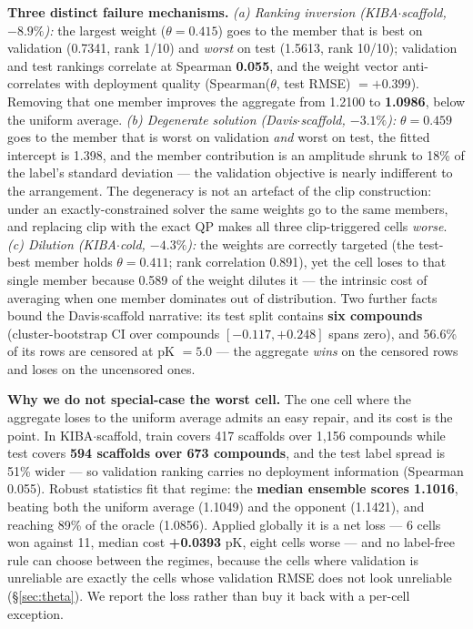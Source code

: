 \documentclass[10pt,letterpaper]{article}
\begin{document}
\textbf{Three distinct failure mechanisms.}\label{sec:fail}
\emph{(a) Ranking inversion (KIBA$\cdot$scaffold, $-8.9\%$):} the largest weight
($\theta = 0.415$) goes to the member that is best on validation (0.7341, rank 1/10)
and \emph{worst} on test (1.5613, rank 10/10); validation and test rankings correlate
at Spearman \textbf{0.055}, and the weight vector anti-correlates with deployment
quality (Spearman($\theta$, test RMSE) $= +0.399$). Removing that one member improves
the aggregate from 1.2100 to \textbf{1.0986}, below the uniform average.
\emph{(b) Degenerate solution (Davis$\cdot$scaffold, $-3.1\%$):} $\theta = 0.459$
goes to the member that is worst on validation \emph{and} worst on test, the fitted
intercept is 1.398, and the member contribution is an amplitude shrunk to 18\% of the
label's standard deviation --- the validation objective is nearly indifferent to the
arrangement. The degeneracy is not an artefact of the clip construction: under an
exactly-constrained solver the same weights go to the same members, and replacing
clip with the exact QP makes all three clip-triggered cells \emph{worse}.
\emph{(c) Dilution (KIBA$\cdot$cold, $-4.3\%$):} the weights are correctly targeted
(the test-best member holds $\theta = 0.411$; rank correlation 0.891), yet the cell
loses to that single member because 0.589 of the weight dilutes it --- the intrinsic
cost of averaging when one member dominates out of distribution. Two further facts
bound the Davis$\cdot$scaffold narrative: its test split contains \textbf{six
compounds} (cluster-bootstrap CI over compounds $[-0.117,+0.248]$ spans zero), and
56.6\% of its rows are censored at pK $= 5.0$ --- the aggregate \emph{wins} on the
censored rows and loses on the uncensored ones.

\textbf{Why we do not special-case the worst cell.} The one cell where the aggregate
loses to the uniform average admits an easy repair, and its cost is the point. In
KIBA$\cdot$scaffold, train covers 417 scaffolds over 1{,}156 compounds while test
covers \textbf{594 scaffolds over 673 compounds}, and the test label spread is 51\%
wider --- so validation ranking carries no deployment information (Spearman 0.055).
Robust statistics fit that regime: the \textbf{median ensemble scores 1.1016},
beating both the uniform average (1.1049) and the opponent (1.1421), and reaching
89\% of the oracle (1.0856). Applied globally it is a net loss --- 6 cells won against
11, median cost \textbf{+0.0393} pK, eight cells worse --- and no label-free rule can
choose between the regimes, because the cells where validation is unreliable are
exactly the cells whose validation RMSE does not look unreliable \citep{sun2016}
(\S\ref{sec:theta}). We report the loss rather than buy it back with a per-cell
exception.
\end{document}

